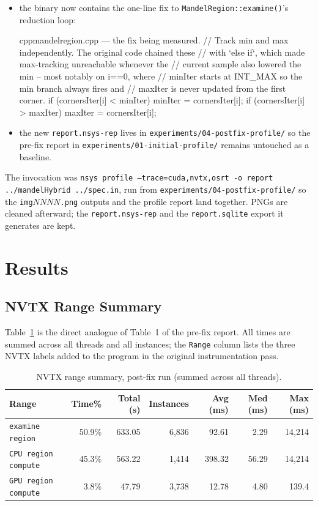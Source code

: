 \documentclass[
	english,
	letterpaper, oneside
]{article}
\begin{document}
\begin{itemize}
    \item the binary now contains the one-line fix to
    \texttt{MandelRegion::examine()}'s reduction loop:

\begin{sourcecode}{cpp}{mandelregion.cpp --- the fix being measured.}
// Track min and max independently. The original code chained these
// with `else if`, which made max-tracking unreachable whenever the
// current sample also lowered the min -- most notably on i==0, where
// minIter starts at INT_MAX so the min branch always fires and
// maxIter is never updated from the first corner.
if (cornersIter[i] < minIter)
  minIter = cornersIter[i];
if (cornersIter[i] > maxIter)
  maxIter = cornersIter[i];
\end{sourcecode}

    \item the new \texttt{report.nsys-rep} lives in \texttt{experiments/04-postfix-profile/}
    so the pre-fix report in \texttt{experiments/01-initial-profile/} remains untouched as
    a baseline.
\end{itemize}

The invocation was
\texttt{nsys profile --trace=cuda,nvtx,osrt -o report ../mandelHybrid ../spec.in},
run from \texttt{experiments/04-postfix-profile/} so the \texttt{img$NNNN$.png} outputs and
the profile report land together. PNGs are cleaned afterward; the
\texttt{report.nsys-rep} and the \texttt{report.sqlite} export it
generates are kept.

\section{Results}

\subsection{NVTX Range Summary}

Table~\ref{tab:nvtx-post} is the direct analogue of Table~1 of the
pre-fix report. All times are summed across all threads and all
instances; the \texttt{Range} column lists the three NVTX labels added
to the program in the original instrumentation pass.

\begin{table}[H]
    \centering
    \caption{NVTX range summary, post-fix run (summed across all threads).}
    \label{tab:nvtx-post}
    \begin{tabular}{lrrrrrr}
        \hline
        Range & Time\% & Total (s) & Instances & Avg (ms) & Med (ms) & Max (ms) \\
        \hline
        \texttt{examine region}     & 50.9\% & 633.05 & 6{,}836 &  92.61 & 2.29 & 14{,}214 \\
        \texttt{CPU region compute} & 45.3\% & 563.22 & 1{,}414 & 398.32 & 56.29 & 14{,}214 \\
        \texttt{GPU region compute} &  3.8\% &  47.79 & 3{,}738 &  12.78 & 4.80 &    139.4 \\
        \hline
    \end{tabular}
\end{table}
\end{document}
